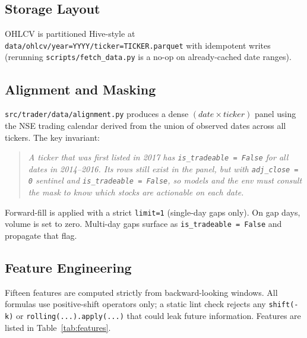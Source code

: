 \documentclass[11pt,a4paper]{article}
\begin{document}
\subsection{Storage Layout}

OHLCV is partitioned Hive-style at\\
\texttt{data/ohlcv/year=YYYY/ticker=TICKER.parquet} with idempotent writes (rerunning
\texttt{scripts/fetch\_data.py} is a no-op on already-cached date ranges).

\subsection{Alignment and Masking}

\texttt{src/trader/data/alignment.py} produces a dense $(date \times ticker)$ panel
using the NSE trading calendar derived from the union of observed dates across all
tickers. The key invariant:

\begin{quote}
\itshape
A ticker that was first listed in 2017 has \texttt{is\_tradeable = False} for all
dates in 2014--2016. Its rows still exist in the panel, but with \texttt{adj\_close = 0}
sentinel and \texttt{is\_tradeable = False}, so models and the env must consult the
mask to know which stocks are actionable on each date.
\end{quote}

Forward-fill is applied with a strict \texttt{limit=1} (single-day gaps only). On gap
days, volume is set to zero. Multi-day gaps surface as \texttt{is\_tradeable = False}
and propagate that flag.

\subsection{Feature Engineering}

Fifteen features are computed strictly from backward-looking windows. All formulas use
positive-shift operators only; a static lint check rejects any \texttt{shift(-k)} or
\texttt{rolling(...).apply(...)} that could leak future information. Features are
listed in Table~\ref{tab:features}.
\end{document}
